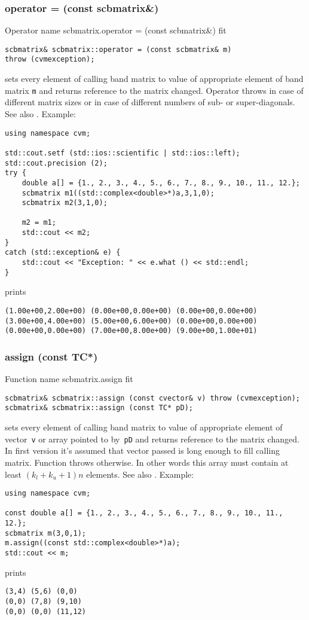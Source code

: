 \subsubsection{operator = (const scbmatrix\&)}
Operator%
\pdfdest name {scbmatrix.operator = (const scbmatrix&)} fit
\begin{verbatim}
scbmatrix& scbmatrix::operator = (const scbmatrix& m)
throw (cvmexception);
\end{verbatim}
sets every element of  calling band matrix to value of
appropriate element of  band matrix \verb"m"
and returns  reference to
the matrix changed.
Operator throws  
in case of different matrix sizes or in case of different numbers
of sub- or super-diagonals.
See also .
Example:
\begin{Verbatim}
using namespace cvm;

std::cout.setf (std::ios::scientific | std::ios::left); 
std::cout.precision (2);
try {
    double a[] = {1., 2., 3., 4., 5., 6., 7., 8., 9., 10., 11., 12.};
    scbmatrix m1((std::complex<double>*)a,3,1,0);
    scbmatrix m2(3,1,0);

    m2 = m1;
    std::cout << m2;
}
catch (std::exception& e) {
    std::cout << "Exception: " << e.what () << std::endl;
}
\end{Verbatim}
prints
\begin{Verbatim}
(1.00e+00,2.00e+00) (0.00e+00,0.00e+00) (0.00e+00,0.00e+00)
(3.00e+00,4.00e+00) (5.00e+00,6.00e+00) (0.00e+00,0.00e+00)
(0.00e+00,0.00e+00) (7.00e+00,8.00e+00) (9.00e+00,1.00e+01)
\end{Verbatim}
\newpage



\subsubsection{assign (const TC*)}
Function%
\pdfdest name {scbmatrix.assign} fit
\begin{verbatim}
scbmatrix& scbmatrix::assign (const cvector& v) throw (cvmexception);
scbmatrix& scbmatrix::assign (const TC* pD);
\end{verbatim}
sets every element of  calling band matrix to  value of
appropriate element of  vector~\verb'v'
or array pointed to by~\verb"pD"
and returns  reference to
the matrix changed.
In first version it's assumed that vector passed is long
enough to fill calling matrix. Function throws  
otherwise.
In other words this array must contain at least $(k_l + k_u + 1)n$ elements.
See also .
Example:
\begin{Verbatim}
using namespace cvm;

const double a[] = {1., 2., 3., 4., 5., 6., 7., 8., 9., 10., 11., 12.};
scbmatrix m(3,0,1);
m.assign((const std::complex<double>*)a);
std::cout << m;
\end{Verbatim}
prints
\begin{Verbatim}
(3,4) (5,6) (0,0)
(0,0) (7,8) (9,10)
(0,0) (0,0) (11,12)
\end{Verbatim}
\newpage



